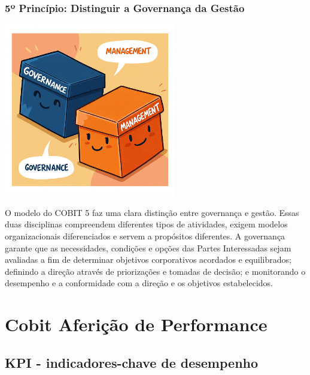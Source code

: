 \documentclass[
]{book}
\begin{document}
\subsubsection{5º Princípio: Distinguir a Governança da Gestão}\label{uxba-princuxedpio-distinguir-a-governanuxe7a-da-gestuxe3o}

\includegraphics[width=2.96875in,height=\textheight]{images/cobit/06-principio-05-cobit.jpg}

O modelo do COBIT 5 faz uma clara distinção entre governança e gestão. Essas duas disciplinas compreendem diferentes tipos de atividades, exigem modelos organizacionais diferenciados e servem a propósitos diferentes. A governança garante que as necessidades, condições e opções das Partes Interessadas sejam avaliadas a fim de determinar objetivos corporativos acordados e equilibrados; definindo a direção através de priorizações e tomadas de decisão; e monitorando o desempenho e a conformidade com a direção e os objetivos estabelecidos.

\section{Cobit Aferição de Performance}\label{cobit-aferiuxe7uxe3o-de-performance}

\subsection{KPI - indicadores-chave de desempenho}\label{kpi---indicadores-chave-de-desempenho}
\end{document}
